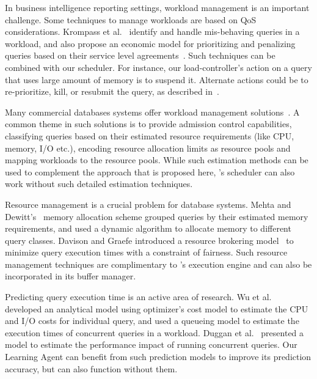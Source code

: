 In business intelligence reporting settings, workload management is an important challenge.
Some techniques to manage workloads are based on QoS considerations. 
Krompass et al.~\cite{krompass2007dynamic} identify and handle mis-behaving queries in a workload, and also propose an economic model for prioritizing and penalizing queries based on their service level agreements~\cite{krompass2006quality}.
Such techniques can be combined with our scheduler. 
For instance, our load-controller's action on a query that uses large amount of memory is to suspend it. 
Alternate actions could be to re-prioritize, kill, or resubmit the query, as described in~\cite{krompass2007dynamic}.

Many commercial databases systems offer workload management solutions~\cite{res_gov, rm, DB2, teradatawm, gpdb, hpwm}.
A common theme in such solutions is to provide admission control capabilities, classifying queries based on their estimated resource requirements (like CPU, memory, I/O etc.), encoding resource allocation limits as resource pools and mapping workloads to the resource pools. 
While such estimation methods can be used to complement the approach that is proposed here, 
\sys{}'s scheduler can also work without such detailed estimation techniques. 

Resource management is a crucial problem for database systems. 
Mehta and Dewitt's~\cite{mehta1993dynamic} memory allocation scheme
grouped queries by their estimated memory requirements, and used a dynamic 
algorithm to allocate memory to different query classes. 
Davison and Graefe introduced a resource brokering model~\cite{davison1995dynamic} to minimize query execution times with a constraint of fairness. 
Such resource management techniques are complimentary to \sys{}'s execution engine 
and can also be incorporated in its buffer manager. 

Predicting query execution time is an active area of research. 
Wu et al.~\cite{wu2013towards, wu2014uncertainty} developed an analytical model using optimizer's cost model to estimate the CPU and I/O costs for individual query, and used a queueing model to estimate the execution times of concurrent queries in a workload. 
Duggan et al.~\cite{duggan2011performance} presented a model to estimate the performance impact of running concurrent queries.
Our Learning Agent can benefit from such prediction models to improve its prediction accuracy, but can also function without them. 

